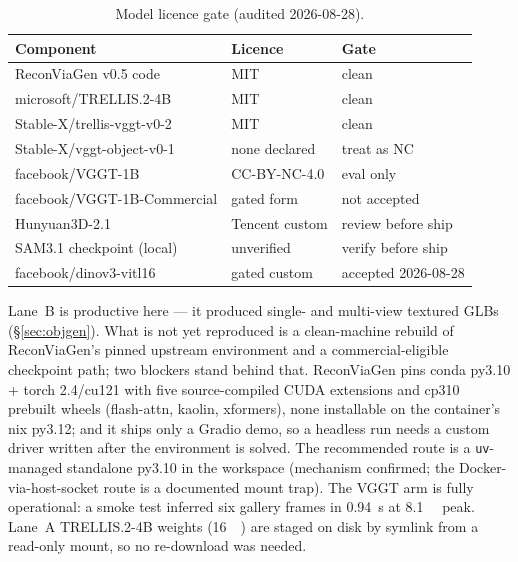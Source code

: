 \begin{table}[t]
\centering\small
\caption{Model licence gate (audited 2026-08-28).
}
\label{tab:licence}
\setlength{\tabcolsep}{3pt}
\begin{tabular}{@{}p{}p{}p{}@{}}
\toprule
Component & Licence & Gate \\
\midrule
ReconViaGen v0.5 code & MIT & clean \\
microsoft/TRELLIS.2-4B & MIT & clean \\
Stable-X/trellis-vggt-v0-2 & MIT & clean \\
Stable-X/vggt-object-v0-1 & none declared & treat as NC \\
facebook/VGGT-1B & CC-BY-NC-4.0 & eval only \\
facebook/VGGT-1B-Commercial & gated form & not accepted \\
Hunyuan3D-2.1 & Tencent custom & review before ship \\
SAM3.1 checkpoint (local) & unverified & verify before ship \\
facebook/dinov3-vitl16 & gated custom & accepted 2026-08-28 \\
\bottomrule
\end{tabular}
\end{table}

Lane~B is productive here --- it produced single- and multi-view textured GLBs (\S\ref{sec:objgen}).
What is not yet reproduced is a clean-machine rebuild of ReconViaGen's pinned upstream environment
and a commercial-eligible checkpoint path; two blockers stand behind that. ReconViaGen pins conda py3.10 +
torch 2.4/cu121 with five source-compiled CUDA extensions and cp310 prebuilt wheels
(flash-attn, kaolin, xformers), none installable on the container's nix py3.12; and it ships only a
Gradio demo, so a headless run needs a custom driver written after the environment is solved. The
recommended route is a \texttt{uv}-managed standalone py3.10 in the workspace (mechanism confirmed;
the Docker-via-host-socket route is a documented mount trap). The VGGT arm is fully operational: a
smoke test inferred six gallery frames in \SI{0.94}{\second} at \SI{8.1}{\giga\byte} peak. Lane~A
TRELLIS.2-4B weights (\SI{16}{\giga\byte}) are staged on disk by symlink from a read-only mount, so
no re-download was needed.

